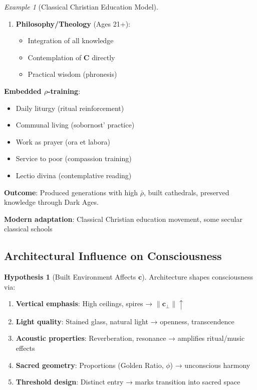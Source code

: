 \documentclass[11pt,a4paper]{article}
\theoremstyle{definition}
\newtheorem{hypothesis}{Hypothesis}[section]
\theoremstyle{remark}
\newtheorem{example}{Example}[section]
\newcommand{\cc}{\mathbf{c}}
\begin{document}
\begin{small}
\begin{enumerate}
\begin{protocol}
\begin{example}[Classical Christian Education Model]
\begin{enumerate}
    \item \textbf{Philosophy/Theology} (Ages 21+):
        \begin{itemize}
            \item Integration of all knowledge
            \item Contemplation of \(\mathbf{C}\) directly
            \item Practical wisdom (phronesis)
        \end{itemize}
\end{enumerate}

\textbf{Embedded \(\rho\)-training}:
\begin{itemize}
    \item Daily liturgy (ritual reinforcement)
    \item Communal living (sobornost' practice)
    \item Work as prayer (ora et labora)
    \item Service to poor (compassion training)
    \item Lectio divina (contemplative reading)
\end{itemize}

\textbf{Outcome}: Produced generations with high \(\bar{\rho}\), built cathedrals, preserved knowledge through Dark Ages.

\textbf{Modern adaptation}: Classical Christian education movement, some secular classical schools
\end{example}

\subsection{Architectural Influence on Consciousness}

\begin{hypothesis}[Built Environment Affects \(\cc\)]
Architecture shapes consciousness via:
\begin{enumerate}
    \item \textbf{Vertical emphasis}: High ceilings, spires → \(\|\cc_\perp\| \uparrow\)
    \item \textbf{Light quality}: Stained glass, natural light → openness, transcendence
    \item \textbf{Acoustic properties}: Reverberation, resonance → amplifies ritual/music effects
    \item \textbf{Sacred geometry}: Proportions (Golden Ratio, \(\phi\)) → unconscious harmony
    \item \textbf{Threshold design}: Distinct entry → marks transition into sacred space
\end{enumerate}


\end{hypothesis}
\end{protocol}
\end{enumerate}
\end{small}
\end{document}
